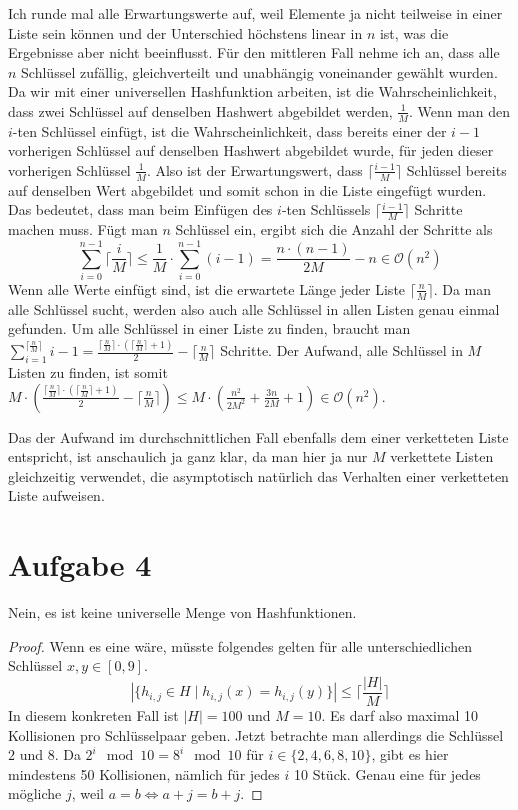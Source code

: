 \documentclass[10pt,a4paper]{article}
\begin{document}
Ich runde mal alle Erwartungswerte auf, weil Elemente ja nicht teilweise in einer Liste sein können und der Unterschied höchstens linear in $n$ ist, was die Ergebnisse aber nicht beeinflusst.
Für den mittleren Fall nehme ich an, dass alle $n$ Schlüssel zufällig, gleichverteilt und unabhängig voneinander gewählt wurden.
Da wir mit einer universellen Hashfunktion arbeiten, ist die Wahrscheinlichkeit, dass zwei Schlüssel auf denselben Hashwert abgebildet werden, $\frac{1}{M}$.
Wenn man den $i$-ten Schlüssel einfügt, ist die Wahrscheinlichkeit, dass bereits einer der $i - 1$ vorherigen Schlüssel auf denselben Hashwert abgebildet wurde, für jeden dieser vorherigen Schlüssel $\frac{1}{M}$.
Also ist der Erwartungswert, dass $\lceil \frac{i - 1}{M} \rceil$ Schlüssel bereits auf denselben Wert abgebildet und somit schon in die Liste eingefügt wurden.
Das bedeutet, dass man beim Einfügen des $i$-ten Schlüssels $\lceil \frac{i - 1}{M} \rceil$ Schritte machen muss.
Fügt man $n$ Schlüssel ein, ergibt sich die Anzahl der Schritte als
\begin{equation}
  \sum_{i = 0}^{n - 1} \lceil \frac{i}{M} \rceil \le \frac{1}{M} \cdot \sum_{i = 0}^{n - 1} (i - 1) = \frac{n \cdot (n - 1)}{2M} - n \in \mathcal{O}(n^{2})
\end{equation}
Wenn alle Werte einfügt sind, ist die erwartete Länge jeder Liste $\lceil \frac{n}{M} \rceil$.
Da man alle Schlüssel sucht, werden also auch alle Schlüssel in allen Listen genau einmal gefunden.
Um alle Schlüssel in einer Liste zu finden, braucht man $\sum_{i = 1}^{\lceil \frac{n}{M} \rceil} i - 1 = \frac{\lceil \frac{n}{M} \rceil \cdot (\lceil \frac{n}{M} \rceil + 1)}{2} - \lceil \frac{n}{M} \rceil$ Schritte.
Der Aufwand, alle Schlüssel in $M$ Listen zu finden, ist somit $M \cdot (\frac{\lceil \frac{n}{M} \rceil \cdot (\lceil \frac{n}{M} \rceil + 1)}{2} - \lceil \frac{n}{M} \rceil) \le M \cdot (\frac{n^{2}}{2M^{2}} + \frac{3n}{2M} + 1) \in \mathcal{O}(n^{2})$.

Das der Aufwand im durchschnittlichen Fall ebenfalls dem einer verketteten Liste entspricht, ist anschaulich ja ganz klar, da man hier ja nur $M$ verkettete Listen gleichzeitig verwendet, die asymptotisch natürlich das Verhalten einer verketteten Liste aufweisen.

\section{Aufgabe 4}
Nein, es ist keine universelle Menge von Hashfunktionen.
\begin{proof}
  Wenn es eine wäre, müsste folgendes gelten für alle unterschiedlichen Schlüssel $x, y \in [0, 9]$.
  \begin{equation}
    |\{ h_{i,j} \in H \mid h_{i,j}(x) = h_{i,j}(y) \}| \le \lceil \frac{|H|}{M} \rceil
  \end{equation}
  In diesem konkreten Fall ist $|H| = 100$ und $M = 10$.
  Es darf also maximal 10 Kollisionen pro Schlüsselpaar geben.
  Jetzt betrachte man allerdings die Schlüssel $2$ und $8$.
  Da $2^{i} \mod 10 = 8^{i} \mod 10$ für $i \in \{ 2, 4, 6, 8, 10 \}$, gibt es hier mindestens 50 Kollisionen, nämlich für jedes $i$ 10 Stück.
  Genau eine für jedes mögliche $j$, weil $a = b \Leftrightarrow a + j = b + j$.
\end{proof}
\end{document}
